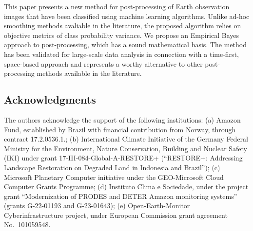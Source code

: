 \documentclass[
  shortnames]{jss}
\begin{document}
This paper presents a new method for post-processing of Earth observation images that have been classified using machine learning algorithms. Unlike ad-hoc smoothing methods avaliable in the literature, the proposed algorithm relies on objective metrics of class probability variance. We propose an Empirical Bayes approach to post-processing, which has a sound mathematical basis. The method has been validated for large-scale data analysis in connection with a time-first, space-based approach and represents a worthy alternative to other post-processing methods available in the literature.

\subsection*{Acknowledgments}\label{acknowledgments}

The authors acknowledge the support of the following institutions: (a) Amazon Fund, established by Brazil with financial contribution from Norway, through contract 17.2.0536.1.; (b) International Climate Initiative of the Germany Federal Ministry for the Environment, Nature Conservation, Building and Nuclear Safety (IKI) under grant 17-III-084-Global-A-RESTORE+ (``RESTORE+: Addressing Landscape Restoration on Degraded Land in Indonesia and Brazil''); (c) Microsoft Planetary Computer initiative under the GEO-Microsoft Cloud Computer Grants Programme; (d)
Instituto Clima e Sociedade, under the project grant ``Modernization of PRODES and DETER Amazon monitoring systems'' (grants G-22-01193 and G-23-01643); (e) Open-Earth-Monitor Cyberinfrastructure project, under European Commission grant agreement No.~101059548.


\end{document}
